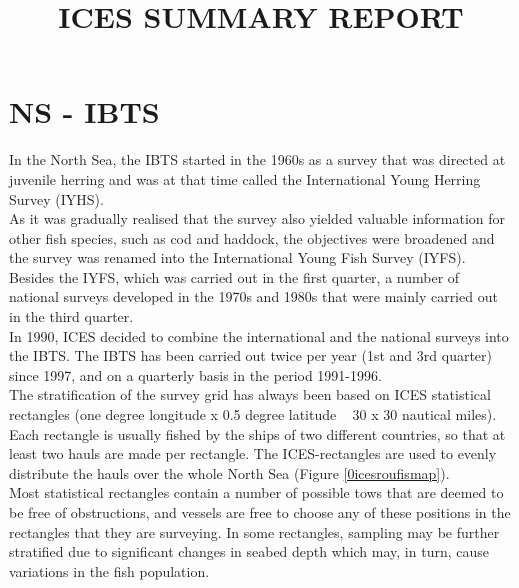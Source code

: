 \documentclass[useAMS,referee]{biom}
\author{}
\date{}
\title[ICES REPORT]{ICES SUMMARY REPORT}
\numberwithin{equation}{section}
\begin{document}
\label{firstpage}


\begin{abstract}

\end{abstract}


\begin{keywords}

\end{keywords}


\maketitle

\section{NS - IBTS}

In the North Sea, the IBTS started in the 1960s as a survey that was directed at juvenile herring and was at that time called the International Young Herring Survey (IYHS). \\

\indent As it was gradually realised that the survey also yielded valuable information for other fish species, such as cod and haddock, the objectives were broadened and the survey was renamed into the International Young Fish Survey (IYFS). Besides the IYFS, which was carried out in the first quarter, a number of national surveys developed in the 1970s and 1980s that were mainly carried out in the third quarter. \\

\indent  In 1990, ICES decided to combine the international and the national surveys into the IBTS. The IBTS has been carried out twice per year (1st and 3rd quarter) since 1997, and on a quarterly basis in the period 1991-1996. \\

\indent The stratification of the survey grid has always been based on ICES statistical rectangles (one degree longitude x 0.5 degree latitude ~ 30 x 30 nautical miles). Each rectangle is usually fished by the ships of two different countries, so that at least two hauls are made per rectangle. The ICES-rectangles are used to evenly distribute the hauls over the whole North Sea (Figure \ref{0icesroufismap}).\\

\indent  Most statistical rectangles contain a number of possible tows that are deemed to be free of obstructions, and vessels are free to choose any of these positions in the rectangles that they are surveying. In some rectangles, sampling may be further stratified due to significant changes in seabed depth which may, in turn, cause variations in the fish population. \\
 
\end{document}
